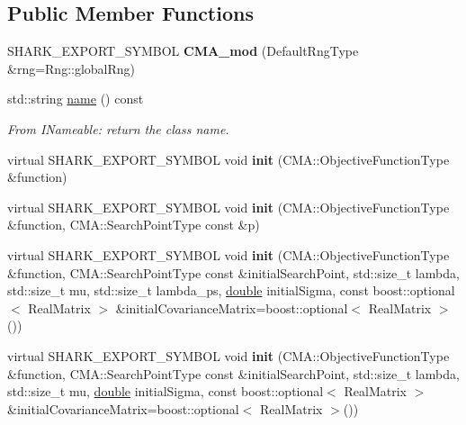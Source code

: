\subsection*{Public Member Functions}
\begin{DoxyCompactItemize}
\item 
S\+H\+A\+R\+K\+\_\+\+E\+X\+P\+O\+R\+T\+\_\+\+S\+Y\+M\+B\+OL {\bfseries C\+M\+A\+\_\+mod} (Default\+Rng\+Type \&rng=Rng\+::global\+Rng)\hypertarget{classCMA__mod_a27765c8375abcebf17de89314b78ff64}{}\label{classCMA__mod_a27765c8375abcebf17de89314b78ff64}

\item 
std\+::string \hyperlink{classCMA__mod_a2c55518c5d07f444591cd35e9e3fb680}{name} () const \hypertarget{classCMA__mod_a2c55518c5d07f444591cd35e9e3fb680}{}\label{classCMA__mod_a2c55518c5d07f444591cd35e9e3fb680}

\begin{DoxyCompactList}\small\item\em From I\+Nameable\+: return the class name. \end{DoxyCompactList}\item 
virtual S\+H\+A\+R\+K\+\_\+\+E\+X\+P\+O\+R\+T\+\_\+\+S\+Y\+M\+B\+OL void {\bfseries init} (C\+M\+A\+::\+Objective\+Function\+Type \&function)\hypertarget{classCMA__mod_a5fd27e36fcb8dc7c51f20d262c672c88}{}\label{classCMA__mod_a5fd27e36fcb8dc7c51f20d262c672c88}

\item 
virtual S\+H\+A\+R\+K\+\_\+\+E\+X\+P\+O\+R\+T\+\_\+\+S\+Y\+M\+B\+OL void {\bfseries init} (C\+M\+A\+::\+Objective\+Function\+Type \&function, C\+M\+A\+::\+Search\+Point\+Type const \&p)\hypertarget{classCMA__mod_a53be322b38fb29694a692af865ce0342}{}\label{classCMA__mod_a53be322b38fb29694a692af865ce0342}

\item 
virtual S\+H\+A\+R\+K\+\_\+\+E\+X\+P\+O\+R\+T\+\_\+\+S\+Y\+M\+B\+OL void {\bfseries init} (C\+M\+A\+::\+Objective\+Function\+Type \&function, C\+M\+A\+::\+Search\+Point\+Type const \&initial\+Search\+Point, std\+::size\+\_\+t lambda, std\+::size\+\_\+t mu, std\+::size\+\_\+t lambda\+\_\+ps, \hyperlink{classdouble}{double} initial\+Sigma, const boost\+::optional$<$ Real\+Matrix $>$ \&initial\+Covariance\+Matrix=boost\+::optional$<$ Real\+Matrix $>$())\hypertarget{classCMA__mod_a0d95993f0ba098a4925f462332d4eeba}{}\label{classCMA__mod_a0d95993f0ba098a4925f462332d4eeba}

\item 
virtual S\+H\+A\+R\+K\+\_\+\+E\+X\+P\+O\+R\+T\+\_\+\+S\+Y\+M\+B\+OL void {\bfseries init} (C\+M\+A\+::\+Objective\+Function\+Type \&function, C\+M\+A\+::\+Search\+Point\+Type const \&initial\+Search\+Point, std\+::size\+\_\+t lambda, std\+::size\+\_\+t mu, \hyperlink{classdouble}{double} initial\+Sigma, const boost\+::optional$<$ Real\+Matrix $>$ \&initial\+Covariance\+Matrix=boost\+::optional$<$ Real\+Matrix $>$())\hypertarget{classCMA__mod_a0e4b8c0acb6ab7d92aef8ce1285cd6fc}{}\label{classCMA__mod_a0e4b8c0acb6ab7d92aef8ce1285cd6fc}


\end{DoxyCompactItemize}
